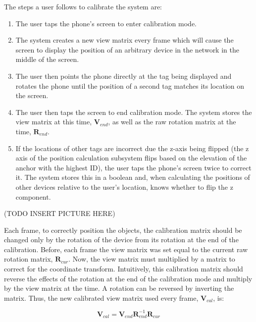 The steps a user follows to calibrate the system are:
\begin{enumerate}
	\item The user taps the phone's screen to enter calibration mode.
	\item The system creates a new view matrix every frame which will cause the screen to display the position of an arbitrary device in the network in the middle of the screen.
	\item The user then points the phone directly at the tag being displayed and rotates the phone until the position of a second tag matches its location on the screen.
	\item The user then taps the screen to end calibration mode. The system stores the view matrix at this time, $\mathbf{V}_{end}$, as well as the raw rotation matrix at the time, $\mathbf{R}_{end}$.
	\item If the locations of other tags are incorrect due the z-axis being flipped (the z axis of the position calculation subsystem flips based on the elevation of the anchor with the highest ID), the user taps the phone's screen twice to correct it. The system stores this in a boolean and, when calculating the positions of other devices relative to the user's location, knows whether to flip the z component.
\end{enumerate}

(TODO INSERT PICTURE HERE)

Each frame, to correctly position the objects, the calibration matrix should be changed only by the rotation of the device from its rotation at the end of the calibration. Before, each frame the view matrix was set equal to the current raw rotation matrix, $\mathbf{R}_{cur}$. Now, the view matrix must multiplied by a matrix to correct for the coordinate transform. Intuitively, this calibration matrix should reverse the effects of the rotation at the end of the calibration mode and multiply by the view matrix at the time. A rotation can be reversed by inverting the matrix. Thus, the new calibrated view matrix used every frame, $\mathbf{V}_{cal}$, is:

\[ 
	\mathbf{V}_{cal} = \mathbf{V}_{end} \mathbf{R}^{-1}_{end} \mathbf{R}_{cur}
\]

